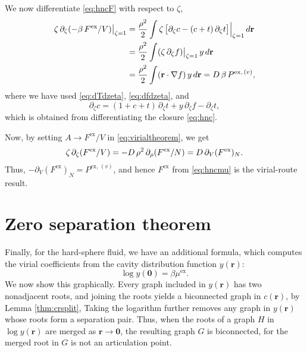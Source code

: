 \documentclass[preprint]{revtex4-1}
\newcommand{\vct}[1]{\mathbf{#1}}
\providecommand{\vr}{} %
\renewcommand{\vr}{\vct{r}}
\newcommand{\supex}[1]{ { { #1 }^{ \mathrm{ex} } } }
\newcommand{\supexv}[1]{ { { #1 }^{ \mathrm{ex}, \, (v) } } }
\newcommand{\Pex}{\supex{P}}
\newcommand{\Pexv}{\supexv{P}}
\newcommand{\Fex}{\supex{F}}
\newcommand{\muex}{\supex{\mu}}
\begin{document}
We now differentiate \eqref{eq:hncF} with respect to $\zeta$,
\begin{align}
  \zeta \, \partial_\zeta (-\beta\,\Fex/V) \big|_{\zeta = 1}
&=
\frac{\rho^2}{2} \int
  \zeta \, \bigl[
    \partial_\zeta c - (c + t) \, \partial_\zeta t
  \bigr] \Big|_{\zeta = 1} \, d\vr
  \notag \\
&= \frac{\rho^2}{2} \int (\zeta \, \partial_\zeta f) \big|_{\zeta = 1} \, y \, d\vr
  \notag \\
&= \frac{\rho^2}{2} \int (\vr \cdot \nabla f) \, y \, d\vr
= D \, \beta \, \Pexv,
  \notag
\end{align}
%
where we have used \eqref{eq:dTdzeta}, \eqref{eq:dfdzeta}, %
and
\[
  \partial_\zeta c
  = (1 + c + t) \, \partial_\zeta t
  + y \, \partial_\zeta f - \partial_\zeta t,
\]
which is obtained from differentiating the closure \eqref{eq:hnc}.

Now, by setting $A \rightarrow \Fex / V$ in \eqref{eq:virialtheorem}, we get
\begin{align}
  \zeta \, \partial_\zeta (\Fex/V)
  = -D \, \rho^2 \, \partial_\rho (\Fex/N)
  = D \, \partial_V (\Fex)_N.
    \notag %
\end{align}
Thus, $-\partial_V (\Fex)_N = \Pexv$,
and hence $\Fex$ from \eqref{eq:hncmu} is the virial-route result.
%





\section{Zero separation theorem}

Finally, for the hard-sphere fluid, we have an additional formula,
  which computes the virial coefficients
  from the cavity distribution function $y(\vr)$\cite{hoover1962}:
%
\begin{equation}
  \log y(\vct0) = \beta \muex.
  \label{eq:yrzerosep}
\end{equation}
%
We now show this graphically.
%
Every graph included in $y(\vr)$
  has two nonadjacent roots\cite{hansen},
%
  and joining the roots
  yields a biconnected graph in $c(\vr)$,
  by Lemma \ref{thm:crsplit},
%
Taking the logarithm further
  removes any graph in $y(\vr)$
  whose roots form
  a separation pair\cite{hansen}.
%
Thus, when the roots of a graph $H$ in $\log y(\vr)$
  are merged as $\vr \rightarrow \vct0$,
  the resulting graph $G$ is biconnected,
  for the merged root in $G$ is not an articulation point.
\end{document}
